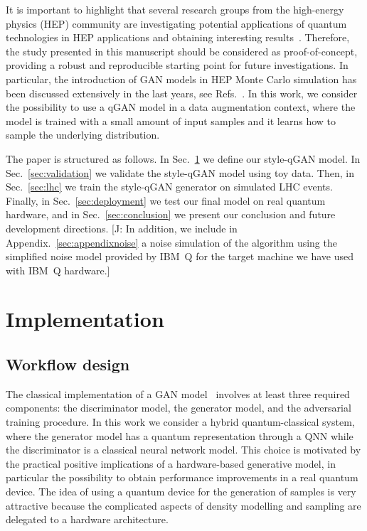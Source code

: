 \documentclass[twocolumn,preprintnumbers,superscriptaddress]{revtex4-2}
\newcommand{\commentJB}[1]{{\color{blue} {[J: #1]}}}
\begin{document}
It is important to highlight that several research groups from the high-energy
physics (HEP) community are investigating potential applications of quantum
technologies in HEP applications and obtaining interesting
results~\cite{P_rez_Salinas_2021,Guan_2021,chang2021quantum,Chang_2021,Belis_2021,khattak2021fast}.
Therefore, the study presented in this manuscript should be considered as
proof-of-concept, providing a robust and reproducible starting point for future
investigations. In particular, the introduction of GAN models in HEP Monte Carlo
simulation has been discussed extensively in the last years, see
Refs.~\cite{baldi2021gan,Backes_2021,butter2020generative,Butter_2021,Butter_2020,Bellagente_2020,Butter_2019}.
In this work, we consider the possibility to use a qGAN model in a data
augmentation context, where the model is trained with a small amount of input
samples and it learns how to sample the underlying distribution.

The paper is structured as follows. In Sec.~\ref{sec:implementation} we define our style-qGAN model. In Sec.~\ref{sec:validation} we
validate the style-qGAN model using toy data. Then, in Sec.~\ref{sec:lhc} we train the style-qGAN
generator on simulated LHC events. Finally, in Sec.~\ref{sec:deployment} we test
our final model on real quantum hardware, and in Sec.~\ref{sec:conclusion} we
present our conclusion and future development directions. \commentJB{In addition, we include in Appendix.~\ref{sec:appendixnoise} a noise simulation of the algorithm using the simplified noise model provided by IBM~Q for the target machine we have used with IBM~Q hardware.}

\section{Implementation}
\label{sec:implementation}

\subsection{Workflow design}

The classical implementation of a GAN model~\cite{goodfellow2014generative}
involves at least three required components: the discriminator model, the
generator model, and the adversarial training procedure. In this work we
consider a hybrid quantum-classical system, where the generator model has a
quantum representation through a QNN while the
discriminator is a classical neural network model. This choice is motivated by
the practical positive implications of a hardware-based generative model, in
particular the possibility to obtain performance improvements in a real quantum
device. The idea of using a quantum device for the generation of
samples is very attractive because the complicated aspects of density modelling and sampling are delegated to a hardware architecture.
\end{document}

